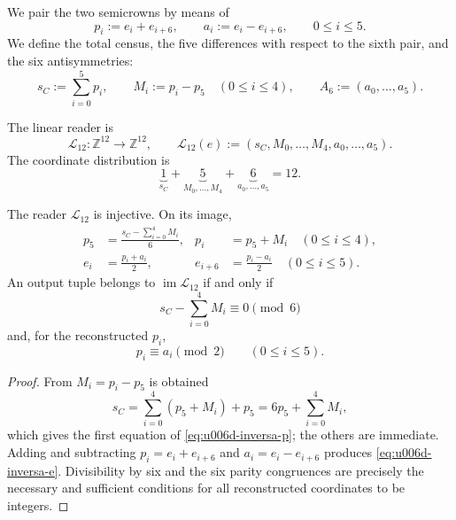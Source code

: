 We pair the two semicrowns by means of
\begin{equation}
 p_i:=e_i+e_{i+6},
 \qquad
 a_i:=e_i-e_{i+6},
 \qquad 0\leq i\leq5.
 \label{eq:u006d-pares-antipodales}
\end{equation}
We define the total census, the five differences with respect to the sixth pair,
and the six antisymmetries:
\begin{equation}
 s_C:=\sum_{i=0}^{5}p_i,
 \qquad
 M_i:=p_i-p_5\quad(0\leq i\leq4),
 \qquad
 A_6:=(a_0,\ldots,a_5).
 \label{eq:u006d-coordenadas-uno-cinco-seis}
\end{equation}

\begin{definition}
\label{def:u006d-lector-integral}
The linear reader is
\begin{equation}
 \mathcal L_{12}:\mathbb Z^{12}\longrightarrow\mathbb Z^{12},
 \qquad
 \mathcal L_{12}(e)
 :=
 (s_C,M_0,\ldots,M_4,a_0,\ldots,a_5).
 \label{eq:u006d-lector-l12}
\end{equation}
The coordinate distribution is
\begin{equation}
 \underbrace{1}_{s_C}
 +\underbrace{5}_{M_0,\ldots,M_4}
 +\underbrace{6}_{a_0,\ldots,a_5}
 =12.
 \label{eq:u006d-uno-cinco-seis}
\end{equation}
\end{definition}

\begin{theorem}
\label{thm:u006d-inversa-l12}
The reader \(\mathcal L_{12}\) is injective. On its image,
\begin{align}
 p_5&=
 \frac{s_C-\sum_{i=0}^{4}M_i}{6},
 &
 p_i&=p_5+M_i\quad(0\leq i\leq4),
 \label{eq:u006d-inversa-p}\\
 e_i&=\frac{p_i+a_i}{2},
 &
 e_{i+6}&=\frac{p_i-a_i}{2}
 \quad(0\leq i\leq5).
 \label{eq:u006d-inversa-e}
\end{align}
An output tuple belongs to \(\operatorname{im}\mathcal L_{12}\) if and
only if
\begin{equation}
 s_C-\sum_{i=0}^{4}M_i\equiv0\pmod6
 \label{eq:u006d-condicion-divisibilidad}
\end{equation}
and, for the reconstructed \(p_i\),
\begin{equation}
 p_i\equiv a_i\pmod2
 \qquad(0\leq i\leq5).
 \label{eq:u006d-condicion-paridad}
\end{equation}
\end{theorem}

\begin{proof}
From \(M_i=p_i-p_5\) is obtained
\[
 s_C=\sum_{i=0}^{4}(p_5+M_i)+p_5
 =6p_5+\sum_{i=0}^{4}M_i,
\]
which gives the first equation of \eqref{eq:u006d-inversa-p}; the others are
immediate. Adding and subtracting
\(p_i=e_i+e_{i+6}\) and \(a_i=e_i-e_{i+6}\) produces
\eqref{eq:u006d-inversa-e}. Divisibility by six and the six
parity congruences are precisely the necessary and
sufficient conditions for all reconstructed coordinates to be integers.
\end{proof}

